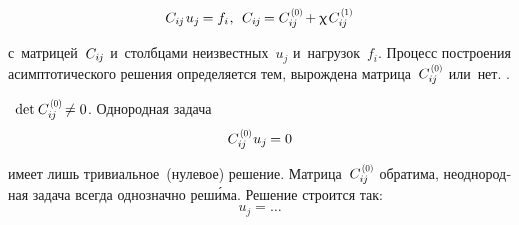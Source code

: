 \begin{otherlanguage}{russian}


\nopagebreak\begin{equation}
C_{i\hspace{-0.1ex}j} \hspace{.2ex} u_{j} \hspace{-0.16ex} = f_{i} \hspace{.1ex} , \:\:
C_{i\hspace{-0.1ex}j} \hspace{-0.2ex} = C_{i\hspace{-0.1ex}j}^{\hspace{0.2ex}\scalebox{0.66}[0.66]{(0)}} \hspace{-0.2ex} + \smallparameter \hspace{.2ex} C_{i\hspace{-0.1ex}j}^{\hspace{0.2ex}\scalebox{0.66}[0.66]{(1)}}
\end{equation}

\noindent
с~матрицей~$C_{i\hspace{-0.1ex}j}$ и~столбцами неизвестных~$u_j$ и~нагрузок~$f_i$.
Процесс построения асимптотического решения определяется тем, вырождена матрица~${C_{i\hspace{-0.1ex}j}^{\hspace{.2ex}\scalebox{0.66}{(0)}}}$ или~нет.
.

\indent
{}\, ${\operatorname{det} \hspace{.16ex} C_{i\hspace{-0.1ex}j}^{\hspace{0.2ex}\scalebox{0.66}[0.66]{(0)}} \hspace{-0.25ex} \neq 0}$.
Однородная задача
\vspace{-0.2em}\begin{equation}
C_{i\hspace{-0.1ex}j}^{\hspace{.2ex}\scalebox{0.66}[0.66]{(0)}} \hspace{.1ex} u_{j} \hspace{-0.16ex} = 0
\end{equation}

\nopagebreak\vspace{-0.5em}\noindent
имеет лишь тривиальное~(нулевое) решение.
Матрица~${C_{i\hspace{-0.1ex}j}^{\hspace{0.2ex}\scalebox{0.66}[0.66]{(0)}}}$ обратима, неоднородная задача всегда однозначно реш\'{и}ма. Решение строится так:
\begin{equation}
u_{j} = \ldots
\end{equation}


\end{otherlanguage}
